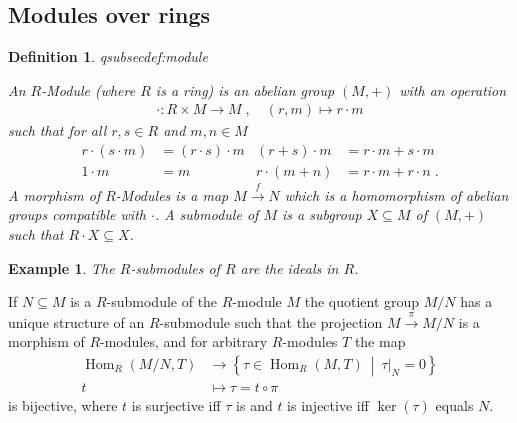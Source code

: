 \documentclass[DIV=14,parskip=full,pointednumbers]{scrartcl}
\theoremstyle{cthm}
\theoremstyle{cvarthm}
\theoremstyle{cdef}
\newtheorem{defi}{Definition}[subsection]
\newtheorem{example}{Example}[subsection]
\newcommand{\lbl}[1]{
	\label{#1}
	\ifmmode
	\expandafter\xdef\csname eqsubsec#1\endcsname{\thesubsection}
	\fi
}
\newcommand{\Hom}{\operatorname{Hom}}
\newcommand{\longto}{\longrightarrow}
\newcommand{\st}{\ \middle|\ }
\begin{document}
	\subsection{Modules over rings}
	\begin{defi}\lbl{def:module}
		An $R$-Module (where $R$ is a ring) is an abelian group $(M,+)$ with an operation
		\begin{align*}
		\cdot: R\times M \longto M\;,\quad  (r,m) \longmapsto r\cdot m
		\end{align*}
		such that for all $r,s\in R$ and $m,n\in M$
		\begin{align*}
		r\cdot(s\cdot m) &= (r\cdot s)\cdot m & (r+s)\cdot m &= r\cdot m + s\cdot m\\
		1\cdot m &= m & r\cdot(m+n)&= r\cdot m +r\cdot n\;. 
		\end{align*}
		A \emph{morphism} of $R$-Modules is a map $M \overset{f}{\longto} N$ which is a homomorphism of abelian groups compatible with $\cdot$.
		A \emph{submodule} of $M$ is a subgroup $X\subseteq M$ of $(M,+)$ such that $R\cdot X \subseteq X$. 
	\end{defi}
	\begin{example} The $R$-submodules of $R$ are the ideals in $R$.
	\end{example}
	\begin{prop} If $N\subseteq M$ is a $R$-submodule of the $R$-module $M$ the quotient group $M/N$ has a unique structure of an $R$-submodule such that the projection $M\overset{\pi}{\longto} M/N$ is a morphism of $R$-modules, and for arbitrary $R$-modules $T$ the map  
		\begin{align*}
		\Hom_R(M/N, T) &\longto \left\{\tau\in \Hom_R(M,T)\st \tau|_N = 0\right\}\\
		t &\longmapsto \tau = t \circ \pi
		\end{align*}
		is bijective, where $t$ is surjective iff $\tau$ is and $t$ is injective iff $\ker(\tau)$ equals $N$.
	\end{prop}
\end{document}
